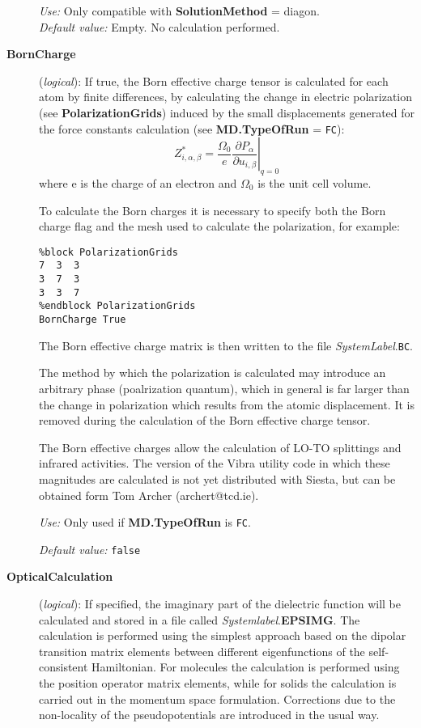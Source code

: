 \documentclass[11pt]{article}
\begin{document}
\begin{description}
{\it Use:} Only compatible with {\bf SolutionMethod} = diagon.\\
{\it Default value:} Empty. No calculation performed.

\item[{\bf BornCharge}] ({\it logical}):
If true, the Born effective charge tensor is calculated for each atom
by finite differences, by calculating the change in electric polarization 
(see {\bf PolarizationGrids}) induced by the small displacements generated 
for the force constants calculation (see {\bf MD.TypeOfRun} = {\tt FC}):
\begin{equation}\label {eq:effective_charge}
Z^*_{i,\alpha,\beta}=\frac{\Omega_0}{e} \left. {\frac{\partial{P_\alpha}}
{\partial{u_{i,\beta}}}}\right|_{q=0}
\end{equation}
where e is the charge of an electron and $\Omega_0$ is the unit cell volume.

To calculate the Born charges it is necessary to specify both the Born 
charge flag and the mesh used to calculate the polarization, for example:
\begin{verbatim}
%block PolarizationGrids
7  3  3
3  7  3
3  3  7
%endblock PolarizationGrids
BornCharge True
\end{verbatim}

The Born effective charge matrix is then written to the file 
{\it SystemLabel}.{\tt BC}.

The method by which the polarization is calculated may introduce an arbitrary 
phase (poalrization quantum), which in general is far larger than the change 
in polarization which results from the atomic displacement. It is removed 
during the calculation of the Born effective charge tensor. 

The Born effective charges allow the calculation of LO-TO splittings and 
infrared activities. The version of the Vibra utility code in which these
magnitudes are calculated is not yet distributed with {\sc Siesta}, but can be 
obtained form Tom Archer (archert@tcd.ie).

{\it Use:} Only used if {\bf MD.TypeOfRun} is {\tt FC}.

{\it Default value:} {\tt false}

\item[{\bf OpticalCalculation}] ({\it logical}): 
If specified, the imaginary part of the dielectric function
will be calculated and stored in a file called {\it Systemlabel}.{\bf EPSIMG}.
The calculation is performed using the simplest approach based on the
dipolar transition matrix elements between different eigenfunctions
of the self-consistent Hamiltonian. For molecules the calculation 
is performed using the position operator matrix elements, while
for solids the calculation is carried out in the momentum space
formulation.
Corrections due to the non-locality of the pseudopotentials
are introduced in the usual way. 


\end{description}
\end{document}
